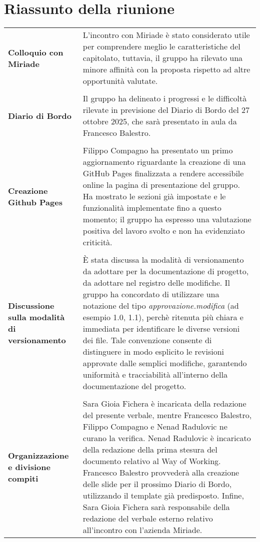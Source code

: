\documentclass[a4paper,12pt]{article}
\begin{document}
\section{Riassunto della riunione}
\begin{longtable}{P{4cm}|P{9cm}}
\textbf{Colloquio con Miriade} & L’incontro con Miriade è stato considerato utile per comprendere meglio le caratteristiche del capitolato, tuttavia, il gruppo ha rilevato una minore affinità con la proposta rispetto ad altre opportunità valutate.\\
\\
\textbf{Diario di Bordo} & Il gruppo ha delineato i progressi e le difficoltà rilevate in previsione del Diario di Bordo del 27 ottobre 2025, che sarà presentato in aula da Francesco Balestro.\\
\\
\textbf{Creazione Github Pages} & Filippo Compagno ha presentato un primo aggiornamento riguardante la creazione di una GitHub Pages finalizzata a rendere accessibile online la pagina di presentazione del gruppo. Ha mostrato le sezioni già impostate e le funzionalità implementate fino a questo momento; il gruppo ha espresso una valutazione positiva del lavoro svolto e non ha evidenziato criticità. \\
\\
\textbf{Discussione sulla modalità di versionamento} & È stata discussa la modalità di versionamento da adottare per la documentazione di progetto, da adottare nel registro delle modifiche. Il gruppo ha concordato di utilizzare una notazione del tipo \textit{approvazione.modifica} (ad esempio 1.0, 1.1), perchè ritenuta più chiara e immediata per identificare le diverse versioni dei file. Tale convenzione consente di distinguere in modo esplicito le revisioni approvate dalle semplici modifiche, garantendo uniformità e tracciabilità all’interno della documentazione del progetto.
\\
\\
\textbf{Organizzazione e divisione compiti} & Sara Gioia Fichera è incaricata della redazione del presente verbale, mentre Francesco Balestro, Filippo Compagno e Nenad Radulovic ne curano la verifica.
Nenad Radulovic è incaricato della redazione della prima stesura del documento relativo al Way of Working.
Francesco Balestro provvederà alla creazione delle slide per il prossimo Diario di Bordo, utilizzando il template già predisposto.
Infine, Sara Gioia Fichera sarà responsabile della redazione del verbale esterno relativo all’incontro con l’azienda Miriade.
\\
\end{longtable}
\end{document}
